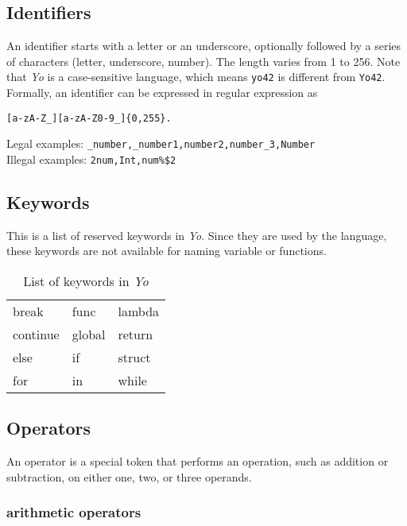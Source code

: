\documentclass[12pt]{article}
\begin{document}
\subsection{Identifiers} %
An identifier starts with a letter or an underscore, optionally followed by a series of characters (letter, underscore, number). The length varies from 1 to 256. Note that \textit{Yo} is a case-sensitive language, which means \texttt{yo42} is different from \texttt{Yo42}. \\
Formally, an identifier can be expressed in regular expression as 
\begin{lstlisting}[caption=Identifier Definition]
[a-zA-Z_][a-zA-Z0-9_]{0,255}.
\end{lstlisting}
Legal examples: \texttt{\_number,\_number1,number2,number\_3,Number}\\
Illegal examples: \texttt{2num,Int,num\%\$2}\\

\subsection{Keywords} %
This is a list of reserved keywords in \textit{Yo}. Since they are used by the language, these keywords are not available for naming variable or functions.\\
\begin{table}[htb!]
\centering
\caption{List of keywords in \textit{Yo}}
\begin{tabular}{lll}
break   & func   & lambda  \\
continue & global & return  \\
else  & if     & struct \\
for   & in     & while  \\
\end{tabular}
\end{table}
\subsection{Operators} %
An operator is a special token that performs an operation, such as addition or subtraction, on either one, two, or three operands. 
\subsubsection{arithmetic operators}
\end{document}
